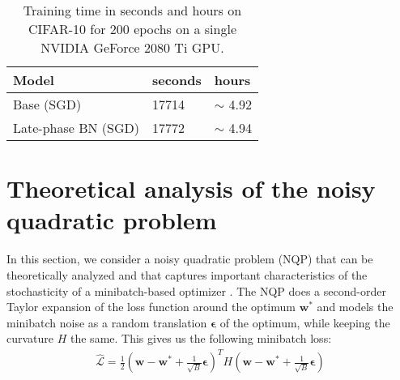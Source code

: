 \documentclass{article} \usepackage{iclr2021_conference,times}
\begin{document}
\begin{table}
\centering
\caption{Training time in seconds and hours on CIFAR-10 for 200 epochs on a single NVIDIA GeForce 2080 Ti GPU. \label{tab:runtime}}
\vspace{-0.2cm}
\begin{tabular}{lll}
\toprule
Model & seconds & hours \\\midrule
Base (SGD)      &     17714  &     $\sim$ 4.92 \\
Late-phase BN (SGD)   &  17772 &  $\sim$ 4.94 \\\bottomrule  
\end{tabular}
\end{table}




\section{Theoretical analysis of the noisy quadratic problem}
\label{apx:NQP}
In this section, we consider a noisy quadratic problem (NQP) that can be theoretically analyzed and that captures important characteristics of the stochasticity of a minibatch-based optimizer \citep{schaul_no_2013, martens_second-order_2016, wu_understanding_2018, zhang_which_2019, zhang_lookahead_2019}. 
The NQP does a second-order Taylor expansion of the loss function around the optimum $\mathbf{w}^*$ and models the minibatch noise as a random translation $\boldsymbol{\epsilon}$ of the optimum, while keeping the curvature $H$ the same. This gives us the following minibatch loss:
\begin{align}\label{eq:noisy_loss_weightspace}
    \hat{\mathcal{L}} = \frac{1}{2}(\mathbf{w} - \mathbf{w}^* + \frac{1}{\sqrt{B}}\boldsymbol{\epsilon})^T H (\mathbf{w} - \mathbf{w}^* + \frac{1}{\sqrt{B}}\boldsymbol{\epsilon})
\end{align}
\end{document}
